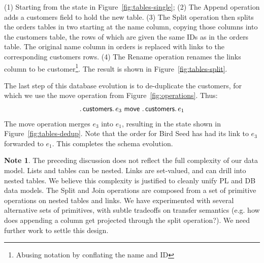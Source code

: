 \documentclass[english,submission]{programming}
\theoremstyle{definition}
\newtheorem*{note}{Note}
\begin{document}
(1) Starting from the state in Figure~\ref{fig:tables-single};
(2) The \textsf{Append} operation adds a \textsf{customers} field to hold the new table. (3) The \textsf{Split} operation then splits the \textsf{orders} tables in two starting at the \textsf{name} column, copying those columns into the \textsf{customers} table, the rows of which are given the same IDs as in the \textsf{orders} table.
The original \textsf{name} column in \textsf{orders} is replaced with links to the corresponding \textsf{customers} rows.
(4) The \textsf{Rename} operation renames the links column to be \textsf{customer}\footnote{Abusing notation by conflating the name and ID}.
The result is shown in Figure~\ref{fig:tables-split}.

The last step of this database evolution is to de-duplicate the customers, for which we use the \textsf{move} operation from Figure~\ref{fig:operations}. Thus:
\[
\ldotp \textsf{customers}\ldotp e_3 \textsf{ move } \ldotp \textsf{customers}\ldotp e_1
\]
The \textsf{move} operation merges $e_3$ into $e_1$, resulting in the state shown in  Figure~\ref{fig:tables-dedup}. Note that the order for Bird Seed has had its link to $e_3$ forwarded to $e_1$. This completes the schema evolution.

\begin{note}
The preceding discussion does not reflect the full complexity of our data model. Lists and tables can be nested. Links are set-valued, and can drill into nested tables. We believe this complexity is justified to cleanly unify PL and DB data models. The \textsf{Split} and \textsf{Join} operations are composed from a set of primitive operations on nested tables and links. We have experimented with several alternative sets of primitives, with subtle tradeoffs on transfer semantics (e.g. how does appending a column get projected through the split operation?). We need further work to settle this design.
\end{note}
\end{document}
